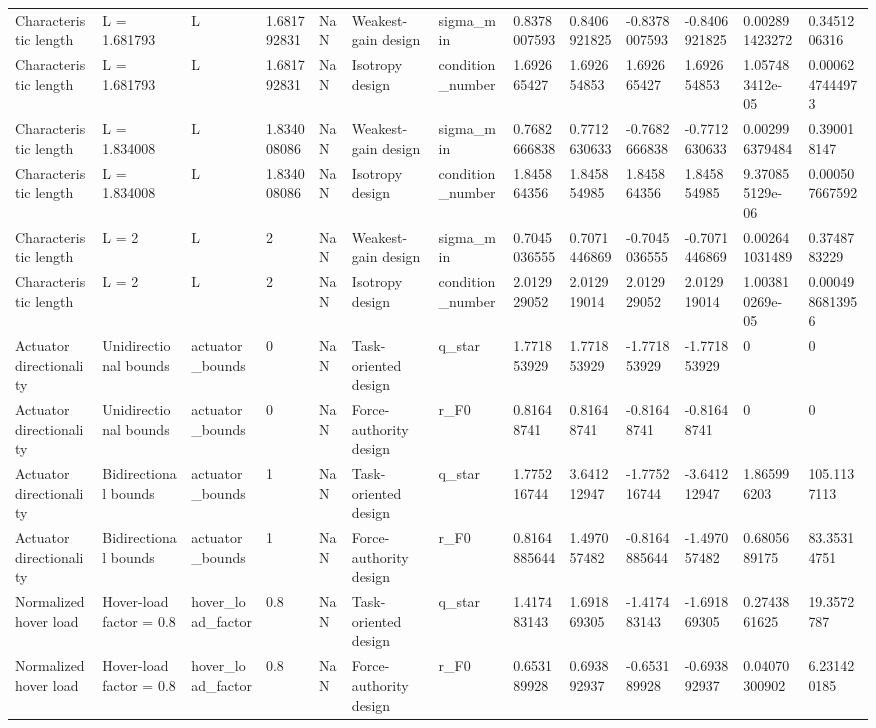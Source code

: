 \begin{tabular}{@{}lllllllllllll@{}}
Characteristic length & L = 1.681793 & L & 1.681792831 & NaN & Weakest-gain design & sigma\_min & 0.8378007593 & 0.8406921825 & -0.8378007593 & -0.8406921825 & 0.002891423272 & 0.3451206316 \\
Characteristic length & L = 1.681793 & L & 1.681792831 & NaN & Isotropy design & condition\_number & 1.692665427 & 1.692654853 & 1.692665427 & 1.692654853 & 1.057483412e-05 & 0.0006247444973 \\
Characteristic length & L = 1.834008 & L & 1.834008086 & NaN & Weakest-gain design & sigma\_min & 0.7682666838 & 0.7712630633 & -0.7682666838 & -0.7712630633 & 0.002996379484 & 0.390018147 \\
Characteristic length & L = 1.834008 & L & 1.834008086 & NaN & Isotropy design & condition\_number & 1.845864356 & 1.845854985 & 1.845864356 & 1.845854985 & 9.370855129e-06 & 0.000507667592 \\
Characteristic length & L = 2 & L & 2 & NaN & Weakest-gain design & sigma\_min & 0.7045036555 & 0.7071446869 & -0.7045036555 & -0.7071446869 & 0.002641031489 & 0.3748783229 \\
Characteristic length & L = 2 & L & 2 & NaN & Isotropy design & condition\_number & 2.012929052 & 2.012919014 & 2.012929052 & 2.012919014 & 1.003810269e-05 & 0.0004986813956 \\
Actuator directionality & Unidirectional bounds & actuator\_bounds & 0 & NaN & Task-oriented design & q\_star & 1.771853929 & 1.771853929 & -1.771853929 & -1.771853929 & 0 & 0 \\
Actuator directionality & Unidirectional bounds & actuator\_bounds & 0 & NaN & Force-authority design & r\_F0 & 0.81648741 & 0.81648741 & -0.81648741 & -0.81648741 & 0 & 0 \\
Actuator directionality & Bidirectional bounds & actuator\_bounds & 1 & NaN & Task-oriented design & q\_star & 1.775216744 & 3.641212947 & -1.775216744 & -3.641212947 & 1.865996203 & 105.1137113 \\
Actuator directionality & Bidirectional bounds & actuator\_bounds & 1 & NaN & Force-authority design & r\_F0 & 0.8164885644 & 1.497057482 & -0.8164885644 & -1.497057482 & 0.6805689175 & 83.35314751 \\
Normalized hover load & Hover-load factor = 0.8 & hover\_load\_factor & 0.8 & NaN & Task-oriented design & q\_star & 1.417483143 & 1.691869305 & -1.417483143 & -1.691869305 & 0.2743861625 & 19.3572787 \\
Normalized hover load & Hover-load factor = 0.8 & hover\_load\_factor & 0.8 & NaN & Force-authority design & r\_F0 & 0.653189928 & 0.693892937 & -0.653189928 & -0.693892937 & 0.04070300902 & 6.231420185 \\

\end{tabular}
